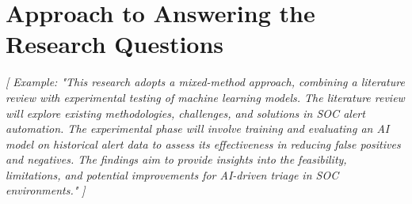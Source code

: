 \chapter{Approach to Answering the Research Questions}
\label{chap:Chapter6}

\textit{
	[
		Example: "This research adopts a mixed-method approach, combining a literature review with experimental testing of machine learning models. 
		The literature review will explore existing methodologies, challenges, and solutions in SOC alert automation. 
		The experimental phase will involve training and evaluating an AI model on historical alert data to assess its effectiveness in reducing false positives and negatives. 
		The findings aim to provide insights into the feasibility, limitations, and potential improvements for AI-driven triage in SOC environments."
	]
}

